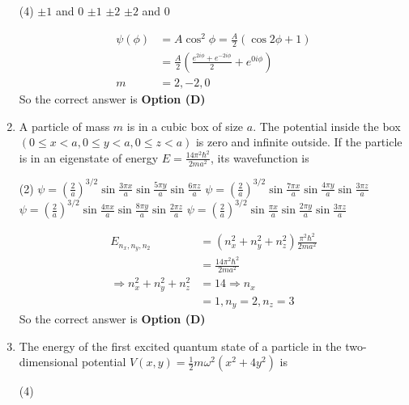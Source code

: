 \begin{enumerate}
{}
\begin{tasks}(4)
\task[\textbf{A.}] $\pm 1$ and 0
\task[\textbf{B.}] $\pm 1$
\task[\textbf{C.}] $\pm 2$
\task[\textbf{D.}] $\pm 2$ and 0
\end{tasks}
\begin{answer}
\begin{align*}
\psi(\phi)&=A \cos ^{2} \phi=\frac{A}{2}(\cos 2 \phi+1)\\
&=\frac{A}{2}\left(\frac{e^{2 i \phi}+e^{-2 i \phi}}{2}+e^{0 i \phi}\right)\\
m&=2,-2,0
\end{align*}
So the correct answer is \textbf{Option (D)}
\end{answer}	
\item A particle of mass $m$ is in a cubic box of size $a$. The potential inside the box $(0 \leq x<a, 0 \leq y<a, 0 \leq z<a)$ is zero and infinite outside. If the particle is in an eigenstate of energy $E=\frac{14 \pi^{2} \hbar^{2}}{2 m a^{2}}$, its wavefunction is
{}
\begin{tasks}(2)
\task[\textbf{A.}]  $\psi=\left(\frac{2}{a}\right)^{3 / 2} \sin \frac{3 \pi x}{a} \sin \frac{5 \pi y}{a} \sin \frac{6 \pi z}{a}$
\task[\textbf{B.}]  $\psi=\left(\frac{2}{a}\right)^{3 / 2} \sin \frac{7 \pi x}{a} \sin \frac{4 \pi y}{a} \sin \frac{3 \pi z}{a}$
\task[\textbf{C.}] $\psi=\left(\frac{2}{a}\right)^{3 / 2} \sin \frac{4 \pi x}{a} \sin \frac{8 \pi y}{a} \sin \frac{2 \pi z}{a}$
\task[\textbf{D.}] $\psi=\left(\frac{2}{a}\right)^{3 / 2} \sin \frac{\pi x}{a} \sin \frac{2 \pi y}{a} \sin \frac{3 \pi z}{a}$
\end{tasks}
\begin{answer}
\begin{align*}
E_{n_{x}, n_{y}, n_{2}}&=\left(n_{x}^{2}+n_{y}^{2}+n_{z}^{2}\right) \frac{\pi^{2} \hbar^{2}}{2 m a^{2}}\\&=\frac{14 \pi^{2} \hbar^{2}}{2 m a^{2}}\\
\Rightarrow n_{x}^{2}+n_{y}^{2}+n_{z}^{2}&=14 \Rightarrow n_{x}\\&=1, n_{y}=2, n_{z}=3
\end{align*}
So the correct answer is \textbf{Option (D)}
\end{answer}	
\item The energy of the first excited quantum state of a particle in the two-dimensional potential $V(x, y)=\frac{1}{2} m \omega^{2}\left(x^{2}+4 y^{2}\right)$ is
{}
\begin{tasks}(4)

\end{tasks}
\end{enumerate}
